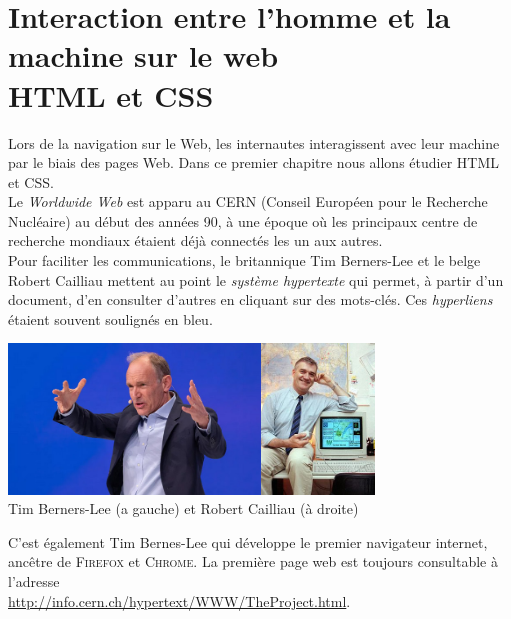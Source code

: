 \documentclass[a4paper,12pt,french]{book}
\begin{document}
\chapter*{\large Interaction entre l'homme et la machine sur le web \\[-1em]\fontsize{35pt}{42pt}\selectfont\titlefont HTML et CSS}

Lors de la navigation sur le Web, les internautes interagissent avec leur machine par le biais
des pages Web. Dans ce premier chapitre nous allons étudier \textsc{HTML} et \textsc{CSS}.\\
Le \textit{Worldwide Web} est apparu au \textsc{CERN} (Conseil Européen pour le Recherche Nucléaire) au début des années 90, à une époque où les 
principaux centre de recherche mondiaux étaient déjà connectés les un aux autres.\\
Pour faciliter les communications, le britannique Tim Berners-Lee et le belge Robert Cailliau mettent au point le \textit{système hypertexte} qui 
permet, à partir d'un document, d'en consulter d'autres en cliquant sur des mots-clés. Ces \textit{hyperliens} étaient souvent soulignés en bleu.
\begin{center}
\includegraphics[height=4cm]{img/tbl.jpg}\hspace{3em}\includegraphics[height=4cm]{img/rc.jpg}\\

Tim Berners-Lee (a gauche) et Robert Cailliau (à droite)
\end{center}
C'est également Tim Bernes-Lee qui développe le premier navigateur internet, ancêtre de \textsc{Firefox} et \textsc{Chrome}.
La première page web est toujours consultable à l'adresse \\\url{http://info.cern.ch/hypertext/WWW/TheProject.html}.\\
\end{document}
